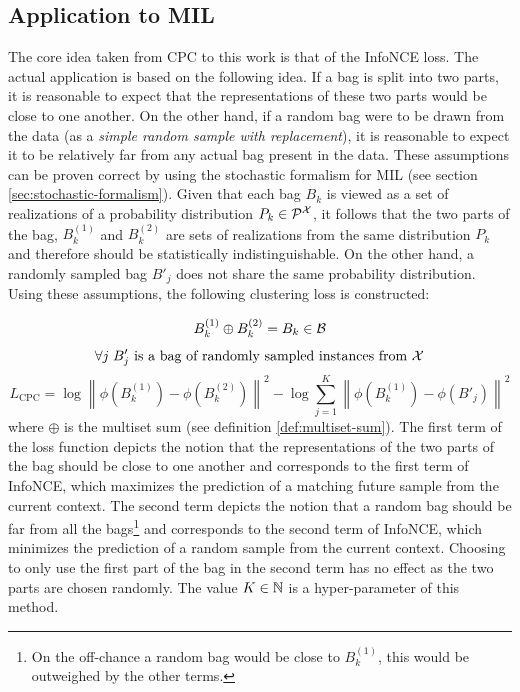 \subsection{Application to MIL}\label{subsec:CPC-application}

The core idea taken from CPC to this work is that of the InfoNCE loss. The actual application is based on the following idea. If a bag is split into two parts, it is reasonable to expect that the representations of these two parts would be close to one another. On the other hand, if a random bag were to be drawn from the data (as a \textit{simple random sample with replacement}), it is reasonable to expect it to be relatively far from any actual bag present in the data. These assumptions can be proven correct by using the stochastic formalism for MIL (see section \ref{sec:stochastic-formalism}). Given that each bag \( B_k \) is viewed as a set of realizations of a probability distribution \( P_k \in \mathcal{P}^\mathspace{X} \), it follows that the two parts of the bag, \( B_k^{(1)} \) and \( B_k^{(2)} \) are sets of realizations from the same distribution \( P_k \) and therefore should be statistically indistinguishable. On the other hand, a randomly sampled bag \( B'_j \) does not share the same probability distribution.
Using these assumptions, the following clustering loss is constructed:

\[ B_k^{(1)} \oplus B_k^{(2)} = B_k \in \mathcal{B} \]
\[ \forall j \; B'_j \text{ is a bag of randomly sampled instances from } \mathcal{X} \]
\[ L_\mathrm{CPC} = \log \left\lVert \phi \left( B_k^{(1)} \right) - \phi \left( B_k^{(2)} \right) \right\rVert^2 - \log \sum_{j = 1}^K \left\lVert \phi \left( B_k^{(1)} \right) - \phi \left( B'_j \right) \right\rVert^2 \]
where \( \oplus \) is the multiset sum (see definition \ref{def:multiset-sum}). The first term of the loss function depicts the notion that the representations of the two parts of the bag should be close to one another and corresponds to the first term of InfoNCE, which maximizes the prediction of a matching future sample from the current context. The second term depicts the notion that a random bag should be far from all the bags\footnote{On the off-chance a random bag would be close to \( B_k^{(1)} \), this would be outweighed by the other terms.} and corresponds to the second term of InfoNCE, which minimizes the prediction of a random sample from the current context. Choosing to only use the first part of the bag in the second term has no effect as the two parts are chosen randomly. The value \( K \in \mathbb{N} \) is a hyper-parameter of this method.

